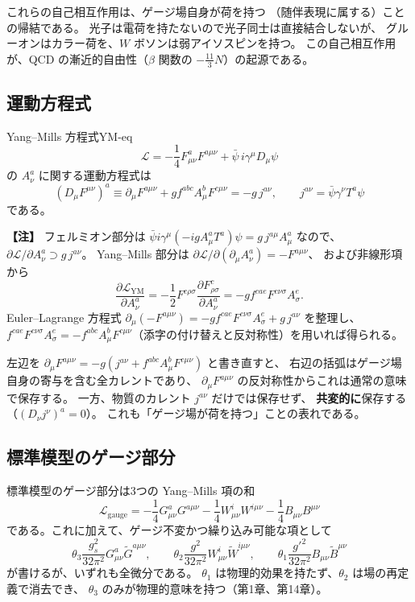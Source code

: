 \documentclass[uplatex,dvipdfmx,a4paper,11pt,openany]{jsbook}
\newenvironment{note}{\vspace{1ex}\par\footnotesize\noindent\textbf{【注】}}{\par\vspace{1ex}}
\numberwithin{equation}{chapter}
\theoremstyle{definition}
\theoremstyle{plain}
\theoremstyle{remark}
\newcommand{\Lag}{\mathcal{L}}
\begin{document}
これらの自己相互作用は、ゲージ場自身が荷を持つ
（随伴表現に属する）ことの帰結である。
光子は電荷を持たないので光子同士は直接結合しないが、
グルーオンはカラー荷を、$W$ ボソンは弱アイソスピンを持つ。
この自己相互作用が、QCD の漸近的自由性（$\beta$ 関数の $-\frac{11}{3}N$）の起源である。
\subsection{運動方程式}
\begin{myprop}{Yang--Mills 方程式}{YM-eq}
\begin{equation}
\Lag=-\frac14F^a_{\mu\nu}F^{a\mu\nu}+\bar\psi\,i\gamma^\mu D_\mu\psi
\end{equation}
の $A_\nu^a$ に関する運動方程式は
\begin{equation}
(D_\mu F^{\mu\nu})^a
\equiv\partial_\mu F^{a\mu\nu}+gf^{abc}A^b_\mu F^{c\mu\nu}
=-g\,j^{a\nu},
\qquad
j^{a\nu}=\bar\psi\gamma^\nu T^a\psi
\end{equation}
である。
\end{myprop}
\begin{note}
フェルミオン部分は $\bar\psi i\gamma^\mu(-igA^a_\mu T^a)\psi=g\,j^{a\mu}A^a_\mu$ なので、
$\partial\Lag/\partial A^a_\nu\supset g\,j^{a\nu}$。
Yang--Mills 部分は
$\partial\Lag/\partial(\partial_\mu A^a_\nu)=-F^{a\mu\nu}$、
および非線形項から
\[
\frac{\partial\Lag_{\mathrm{YM}}}{\partial A^a_\nu}
=-\frac12F^{c\rho\sigma}\frac{\partial F^c_{\rho\sigma}}{\partial A^a_\nu}
=-gf^{cae}F^{c\nu\sigma}A^e_\sigma .
\]
Euler--Lagrange 方程式 $\partial_\mu(-F^{a\mu\nu})=-gf^{cae}F^{c\nu\sigma}A^e_\sigma+g\,j^{a\nu}$ を整理し、
$f^{cae}F^{c\nu\sigma}A^e_\sigma=-f^{abc}A^b_\mu F^{c\mu\nu}$（添字の付け替えと反対称性）を用いれば得られる。
\end{note}
左辺を $\partial_\mu F^{a\mu\nu}=-g\left(j^{a\nu}+f^{abc}A^b_\mu F^{c\mu\nu}\right)$ と書き直すと、
右辺の括弧はゲージ場自身の寄与を含む全カレントであり、
$\partial_\mu F^{a\mu\nu}$ の反対称性からこれは通常の意味で保存する。
一方、物質のカレント $j^{a\nu}$ だけでは保存せず、
\textbf{共変的に}保存する（$(D_\nu j^\nu)^a=0$）。
これも「ゲージ場が荷を持つ」ことの表れである。
\subsection{標準模型のゲージ部分}
標準模型のゲージ部分は3つの Yang--Mills 項の和
\begin{equation}
\Lag_{\mathrm{gauge}}
=-\frac14G^a_{\mu\nu}G^{a\mu\nu}
-\frac14W^i_{\mu\nu}W^{i\mu\nu}
-\frac14B_{\mu\nu}B^{\mu\nu}
\end{equation}
である。これに加えて、ゲージ不変かつ繰り込み可能な項として
\begin{equation}
\theta_3\frac{g_s^2}{32\pi^2}G^a_{\mu\nu}\tilde G^{a\mu\nu},
\qquad
\theta_2\frac{g^2}{32\pi^2}W^i_{\mu\nu}\tilde W^{i\mu\nu},
\qquad
\theta_1\frac{g'^2}{32\pi^2}B_{\mu\nu}\tilde B^{\mu\nu}
\end{equation}
が書けるが、いずれも全微分である。
$\theta_1$ は物理的効果を持たず、$\theta_2$ は場の再定義で消去でき、
$\theta_3$ のみが物理的意味を持つ（第1章、第14章）。
\end{document}
